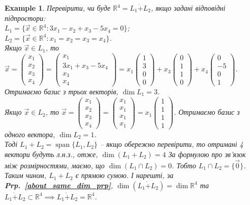 \documentclass[a4paper, 10pt]{article}
\theoremstyle{theoremdd}
\newtheorem{example}[theorem]{Example}
\newcommand\prpref[1]{\textbf{Prp.~\ref{#1}}}
\DeclareMathOperator{\linspan}{span}
\begin{document}
	\begin{example}
	Перевірити, чи буде $\mathbb{R}^4 = L_1 \dot{+} L_2$, якщо задані відповідні підпростори:\\
	$L_1 = \{\vec{x} \in \mathbb{R}^4: 3x_1 - x_2 + x_3 - 5x_4 = 0\}$;\\
	$L_2 = \{\vec{x} \in \mathbb{R}^4: x_1 = x_2 = x_3 = x_4\}$.\\
	Якщо $\vec{x} \in L_1$, то $\vec{x} = \begin{pmatrix} x_1 \\ x_2 \\ x_3 \\ x_4 \end{pmatrix} = \begin{pmatrix}
	x_1 \\ 3x_1+x_3-5x_4 \\ x_3 \\ x_4
	\end{pmatrix} = x_1 \begin{pmatrix}
	1 \\ 3 \\ 0 \\ 0
	\end{pmatrix} + x_3\begin{pmatrix}
	0 \\ 1 \\ 1 \\ 0
	\end{pmatrix} +  x_4\begin{pmatrix}
	0 \\ -5 \\ 0 \\ 1
	\end{pmatrix}$. Отримаємо базис з трьох векторів, $\dim L_1 = 3$.\\
	Якщо $\vec{x} \in L_2$, то $\vec{x} = \begin{pmatrix} x_1 \\ x_2 \\ x_3 \\ x_4 \end{pmatrix} = \begin{pmatrix} x_1 \\ x_1 \\ x_1 \\ x_1 \end{pmatrix} = x_1 \begin{pmatrix} 1 \\ 1 \\ 1 \\ 1 \end{pmatrix}$. Отримаємо базис з одного вектора, $\dim L_2 = 1$.\\
	Тоді $L_1 + L_2 = \linspan\{L_1,L_2\}$ -- якщо обережно перевірити, то отримані 4 вектори будуть л.н.з., отже, $\dim (L_1 + L_2) = 4$ За формулою про зв'язок між розмірностями, маємо, що $\dim{(L_1 \cap L_2)} = 0$. Тобто $L_1 \cap L_2 = \{ \vec{0} \}$.\\
	Таким чином, $L_1 + L_2$ є прямою сумою. І нарешті, за \prpref{about_same_dim_prp}, $\dim{(L_1 \dot{+} L_2)} = \dim {\mathbb{R}^4}$ та \\ $L_1 \dot{+} L_2 \subset \mathbb{R}^4 \implies L_1 \dot{+} L_2 = \mathbb{R}^4$.
	\end{example}
	
\end{document}
